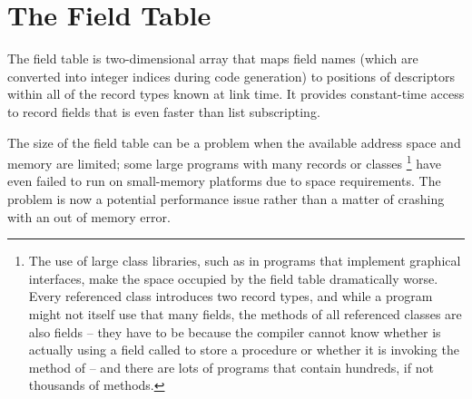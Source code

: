 \section{The Field Table}
\label{FieldTableDescription}
The field table is two-dimensional array that maps field names (which are
converted into integer indices during code generation) to positions of
descriptors within all of the record types known at link time. It provides
constant-time access to record fields that is even faster than list
subscripting.

The size of the field table can be a problem when the available address
space and memory are limited; some large programs with many records or
classes%
\footnote{
The use of large class libraries, such as in programs that implement
graphical interfaces, make the space occupied by the field table dramatically
worse. Every referenced class introduces two record types, and while a
program might not itself use that many fields, the methods of all referenced
classes are also fields -- they have to be because the compiler cannot know
whether  is actually using a field called  to
store a procedure or whether it is invoking the  method of
 -- and there are lots of programs that contain hundreds, if
not thousands of methods.}
%
have even failed to run on small-memory platforms due to space
requirements. The problem is now a potential performance issue rather than a
matter of crashing with an out of memory error.

